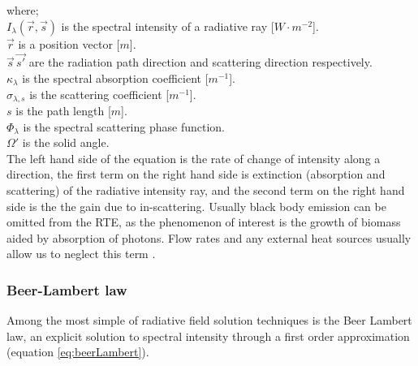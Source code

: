 

where;\\
$I_\lambda (\vec{r}, \vec{s})$ is the spectral intensity of a radiative ray [$W \cdot m^{-2}$]. \\
$\vec{r}$ is a position vector [$m$]. \\
$\vec{s} \, \vec{s'}$ are the radiation path direction and scattering direction respectively.\\
$\kappa_\lambda$ is the spectral absorption coefficient [$m^{-1}$]. \\
$\sigma_{\lambda, s}$ is the scattering coefficient [$m^{-1}$].  \\
$s$ is the path length [$m$]. \\
$\Phi_\lambda$ is the spectral scattering phase function. \\
$\Omega'$ is the solid angle. \\

The left hand side of the equation is the rate of change of intensity along a direction, the first term on the right hand side is extinction (absorption and scattering) of the radiative intensity ray, and the second term on the right hand side is the the gain due to in-scattering. Usually black body emission can be omitted from the RTE, as the phenomenon of interest is the growth of biomass aided by absorption of photons. Flow rates and any external heat sources usually allow us to neglect this term \cite{lee1994}.


\subsubsection{Beer-Lambert law}
\label{S:2.3.1}
Among the most simple of radiative field solution techniques is the Beer Lambert law, an explicit solution to spectral intensity through a first order approximation (equation \ref{eq:beerLambert}). 


